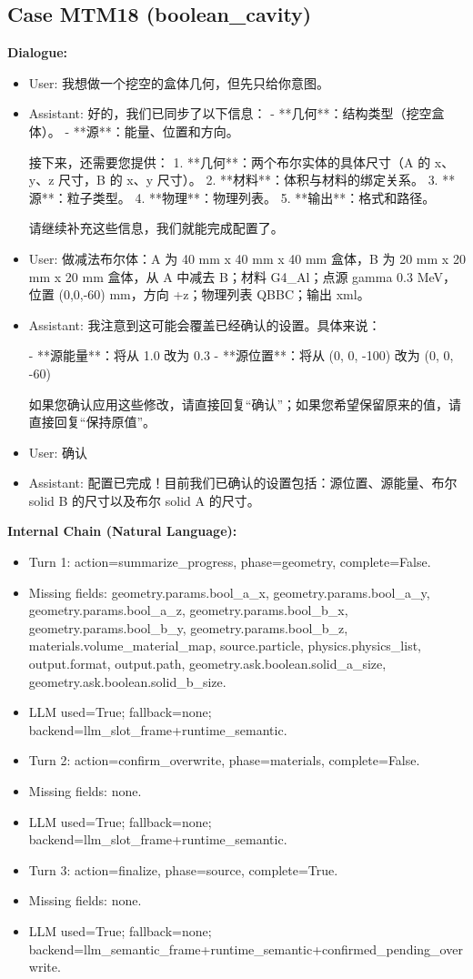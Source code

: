 \documentclass[11pt]{ctexart}
\begin{document}
\subsection{Case MTM18 (boolean\_cavity)}
\textbf{Dialogue:}
\begin{itemize}
\item User: 我想做一个挖空的盒体几何，但先只给你意图。
\item Assistant: 好的，我们已同步了以下信息：
- **几何**：结构类型（挖空盒体）。
- **源**：能量、位置和方向。

接下来，还需要您提供：
1.  **几何**：两个布尔实体的具体尺寸（A 的 x、y、z 尺寸，B 的 x、y 尺寸）。
2.  **材料**：体积与材料的绑定关系。
3.  **源**：粒子类型。
4.  **物理**：物理列表。
5.  **输出**：格式和路径。

请继续补充这些信息，我们就能完成配置了。
\item User: 做减法布尔体：A 为 40 mm x 40 mm x 40 mm 盒体，B 为 20 mm x 20 mm x 20 mm 盒体，从 A 中减去 B；材料 G4\_Al；点源 gamma 0.3 MeV，位置 (0,0,-60) mm，方向 +z；物理列表 QBBC；输出 xml。
\item Assistant: 我注意到这可能会覆盖已经确认的设置。具体来说：

- **源能量**：将从 1.0 改为 0.3
- **源位置**：将从 (0, 0, -100) 改为 (0, 0, -60)

如果您确认应用这些修改，请直接回复“确认”；如果您希望保留原来的值，请直接回复“保持原值”。
\item User: 确认
\item Assistant: 配置已完成！目前我们已确认的设置包括：源位置、源能量、布尔 solid B 的尺寸以及布尔 solid A 的尺寸。
\end{itemize}
\textbf{Internal Chain (Natural Language):}
\begin{itemize}
\item Turn 1: action=summarize\_progress, phase=geometry, complete=False.
\item Missing fields: geometry.params.bool\_a\_x, geometry.params.bool\_a\_y, geometry.params.bool\_a\_z, geometry.params.bool\_b\_x, geometry.params.bool\_b\_y, geometry.params.bool\_b\_z, materials.volume\_material\_map, source.particle, physics.physics\_list, output.format, output.path, geometry.ask.boolean.solid\_a\_size, geometry.ask.boolean.solid\_b\_size.
\item LLM used=True; fallback=none; backend=llm\_slot\_frame+runtime\_semantic.
\item Turn 2: action=confirm\_overwrite, phase=materials, complete=False.
\item Missing fields: none.
\item LLM used=True; fallback=none; backend=llm\_slot\_frame+runtime\_semantic.
\item Turn 3: action=finalize, phase=source, complete=True.
\item Missing fields: none.
\item LLM used=True; fallback=none; backend=llm\_semantic\_frame+runtime\_semantic+confirmed\_pending\_overwrite.
\end{itemize}
\end{document}
